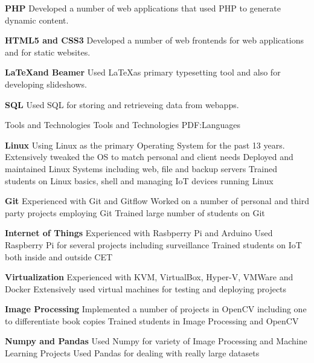 \documentclass[letterpaper,MMMyyyy,nonstopmode]{simpleresumecv}
\begin{document}
\begin{Body}
\BigGap
\BulletItem
\textbf{PHP}
\SubBulletItem
Developed a number of web applications that used PHP to generate dynamic
content.

\BigGap
\BulletItem
\textbf{HTML5 and CSS3}
\SubBulletItem
Developed a number of web frontends for web applications and for static
websites.

\BigGap
\BulletItem
\textbf{\LaTeX and Beamer}
\SubBulletItem
Used \LaTeX as primary typesetting tool and also for developing slideshows.

\BigGap
\BigGap
\BulletItem
\textbf{SQL}
\SubBulletItem
Used SQL for storing and retrieveing data from webapps.


\BigGap
\Section
{Tools and Technologies}
{Tools and Technologies}
{PDF:Languages}

\BulletItem
\textbf{Linux}
\SubBulletItem
Using Linux as the primary Operating System for the past 13 years.
\SubBulletItem
Extensively tweaked the OS to match personal and client needs
\SubBulletItem
Deployed and maintained Linux Systems including web, file and backup servers
\SubBulletItem
Trained students on Linux basics, shell and managing IoT devices running Linux

\BigGap
\BulletItem
\textbf{Git}
\SubBulletItem
Experienced with Git and Gitflow
\SubBulletItem
Worked on a number of personal and third party projects employing Git
\SubBulletItem
Trained large number of students on Git

\BigGap
\BulletItem
\textbf{Internet of Things}
\SubBulletItem
Experienced with Rasbperry Pi and Arduino 
\SubBulletItem
Used Raspberry Pi for several projects including surveillance
\SubBulletItem
Trained students on IoT both inside and outside CET

\BigGap
\BulletItem
\textbf{Virtualization}
\SubBulletItem
Experienced with KVM, VirtualBox, Hyper-V, VMWare and Docker
\SubBulletItem
Extensively used virtual machines for testing and deploying projects

\BigGap
\BulletItem
\textbf{Image Processing}
\SubBulletItem
Implemented a number of projects in OpenCV including one to differentiate book
copies
\SubBulletItem
Trained students in Image Processing and OpenCV

\BigGap
\BulletItem
\textbf{Numpy and Pandas}
\SubBulletItem
Used Numpy for variety of Image Processing and Machine Learning Projects
\SubBulletItem
Used Pandas for dealing with really large datasets


\end{Body}
\end{document}

